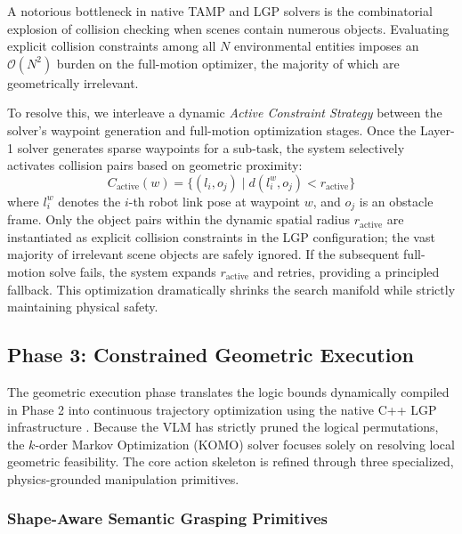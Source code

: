 \documentclass[journal]{IEEEtran}
\begin{document}
  A notorious bottleneck in native TAMP and LGP solvers is the combinatorial
  explosion of collision checking when scenes contain numerous objects. Evaluating
  explicit collision constraints among all $N$ environmental entities imposes an
  $\mathcal{O}(N^2)$ burden on the full-motion optimizer, the majority of which are
  geometrically irrelevant.

  To resolve this, we interleave a dynamic \textit{Active Constraint Strategy}
  between the solver's waypoint generation and full-motion optimization stages.
  Once the Layer-1 solver generates sparse waypoints for a sub-task, the system
  selectively activates collision pairs based on geometric proximity:
  \begin{equation}
    C_{\text{active}}(w) = \{(l_i, o_j) \mid d(l_i^w, o_j) < r_{\text{active}}\}
    \label{eq:active_constraints}
  \end{equation}
  where $l_i^w$ denotes the $i$-th robot link pose at waypoint $w$, and $o_j$ is an
  obstacle frame. Only the object pairs within the dynamic spatial radius
  $r_{\text{active}}$ are instantiated as explicit collision constraints in the LGP
  configuration; the vast majority of irrelevant scene objects are safely ignored.
  If the subsequent full-motion solve fails, the system expands $r_{\text{active}}$
  and retries, providing a principled fallback. This optimization dramatically
  shrinks the search manifold while strictly maintaining physical safety.

  \subsection{Phase 3: Constrained Geometric Execution}
  \label{subsec:phase3}

  The geometric execution phase translates the logic bounds dynamically compiled
  in Phase 2 into continuous trajectory optimization using the native C++ LGP infrastructure
  \cite{cite_lgp_2015}. Because the VLM has strictly pruned the logical
  permutations, the $k$-order Markov Optimization (KOMO) solver focuses solely on
  resolving local geometric feasibility. The core action skeleton is refined
  through three specialized, physics-grounded manipulation primitives.

  \subsubsection{Shape-Aware Semantic Grasping Primitives}
  \label{subsubsec:shape_pick}
\end{document}
